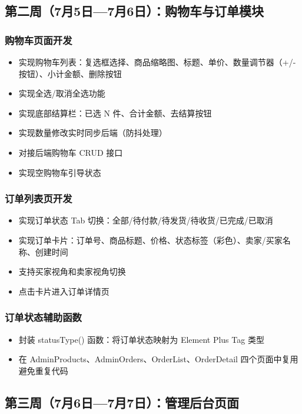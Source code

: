 \documentclass[12pt,a4paper]{ctexart}
\begin{document}
\subsection{第二周（7月5日—7月6日）：购物车与订单模块}

\subsubsection*{购物车页面开发}
\begin{itemize}
    \item 实现购物车列表：复选框选择、商品缩略图、标题、单价、数量调节器（+/-按钮）、小计金额、删除按钮
    \item 实现全选/取消全选功能
    \item 实现底部结算栏：已选 N 件、合计金额、去结算按钮
    \item 实现数量修改实时同步后端（防抖处理）
    \item 对接后端购物车 CRUD 接口
    \item 实现空购物车引导状态
\end{itemize}

\subsubsection*{订单列表页开发}
\begin{itemize}
    \item 实现订单状态 Tab 切换：全部/待付款/待发货/待收货/已完成/已取消
    \item 实现订单卡片：订单号、商品标题、价格、状态标签（彩色）、卖家/买家名称、创建时间
    \item 支持买家视角和卖家视角切换
    \item 点击卡片进入订单详情页
\end{itemize}

\subsubsection*{订单状态辅助函数}
\begin{itemize}
    \item 封装 statusType() 函数：将订单状态映射为 Element Plus Tag 类型
    \item 在 AdminProducts、AdminOrders、OrderList、OrderDetail 四个页面中复用避免重复代码
\end{itemize}

\subsection{第三周（7月6日—7月7日）：管理后台页面}
\end{document}
